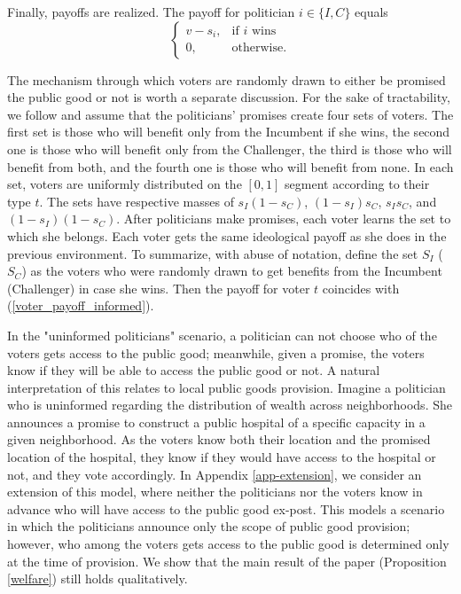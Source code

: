 \documentclass[12pt,english]{article}
\begin{document}
Finally, payoffs are realized. The payoff for politician $i \in \{I,C\}$ equals 
\begin{equation}
\label{p}
\begin{cases}
		 v - s_i, & \text{if $i$ wins}\\
          0, &  \text{otherwise}.
		 \end{cases}
\end{equation}

The mechanism through which voters are randomly drawn to either be promised the public good or not is worth a separate discussion.
For the sake of tractability, we follow \citet{myerson1993incentives} and assume that the politicians' promises create four sets of voters. The first set is those who will benefit only from the Incumbent if she wins, the second one is those who will benefit only from the Challenger, the third is those who will benefit from both, and the fourth one is those who will benefit from none. In each set, voters are uniformly distributed on the $[0,1]$ segment according to their type $t$. The sets have respective masses of $s_I (1-s_C)$, $(1-s_I)s_C$, $s_I s_C$, and $(1-s_I)(1-s_C)$. After politicians make promises, each voter learns the set to which she belongs. Each voter gets the same ideological payoff as she does in the previous environment. To summarize, with abuse of notation, define the set $S_I$ ($S_C$) as the voters who were randomly drawn to get benefits from the Incumbent (Challenger) in case she wins. Then the payoff for voter $t$ coincides with (\ref{voter_payoff_informed}). 

In the "uninformed politicians" scenario, a politician can not choose who of the voters gets access to the public good; meanwhile, given a promise, the voters know if they will be able to access the public good or not. A natural interpretation of this relates to local public goods provision. Imagine a politician who is uninformed regarding the distribution of wealth across neighborhoods. She announces a promise to construct a public hospital of a specific capacity in a given neighborhood. As the voters know both their location and the promised location of the hospital, they know if they would have access to the hospital or not, and they vote accordingly. In Appendix \ref{app-extension}, we consider an extension of this model,  where neither the politicians nor the voters know in advance who will have access to the public good ex-post. This models a scenario in which the politicians announce only the scope of public good provision; however, who among the voters gets access to the public good is determined only at the time of provision. We show that the main result of the paper (Proposition \ref{welfare}) still holds qualitatively. 
\end{document}
